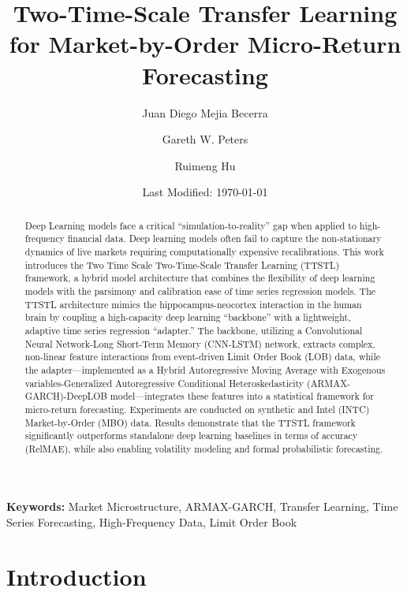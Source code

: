 \documentclass[10pt,a4paper,oneside]{article}
\title{Two-Time-Scale Transfer Learning for Market-by-Order Micro-Return Forecasting}
\author[1]{Juan Diego Mejia Becerra}
\author[1]{Gareth W. Peters}
\author[1,2]{Ruimeng Hu}
\affil[1]{Department of Statistics and Applied Probability, University of California, Santa Barbara}
\affil[2]{Department of Mathematics, University of California, Santa Barbara}
\date{Last Modified: \today}
\providecommand{\DIFaddtex}[1]{{\protect\color{blue} \sf #1}} %
\providecommand{\DIFdeltex}[1]{{\protect\color{red} \scriptsize #1}} %
\providecommand{\DIFaddbegin}{} %
\providecommand{\DIFaddend}{} %
\providecommand{\DIFdelbegin}{} %
\providecommand{\DIFdelend}{} %
\providecommand{\DIFadd}[1]{\texorpdfstring{\DIFaddtex{#1}}{#1}} %
\providecommand{\DIFdel}[1]{\texorpdfstring{\DIFdeltex{#1}}{}} %
\newcommand{\DIFscaledelfig}{0.5}
\newlength{\DIFdelgraphicswidth} %
\newlength{\DIFdelgraphicsheight} %
\newcommand{\DIFaddincludegraphics}[2][]{{\color{blue}\fbox{\DIFOincludegraphics[#1]{#2}}}} %
\newcommand{\DIFdelincludegraphics}[2][]{%
\sbox{\DIFdelgraphicsbox}{\DIFOincludegraphics[#1]{#2}}%
\settoboxwidth{\DIFdelgraphicswidth}{\DIFdelgraphicsbox} %
\settoboxtotalheight{\DIFdelgraphicsheight}{\DIFdelgraphicsbox} %
\scalebox{\DIFscaledelfig}{%
\parbox[b]{\DIFdelgraphicswidth}{\usebox{\DIFdelgraphicsbox}\\[-\baselineskip] \rule{\DIFdelgraphicswidth}{0em}}\llap{\resizebox{\DIFdelgraphicswidth}{\DIFdelgraphicsheight}{%
\setlength{\unitlength}{\DIFdelgraphicswidth}%
\begin{picture}(1,1)%
\thicklines\linethickness{2pt} %
{\color[rgb]{1,0,0}\put(0,0){\framebox(1,1){}}}%
{\color[rgb]{1,0,0}\put(0,0){\line( 1,1){1}}}%
{\color[rgb]{1,0,0}\put(0,1){\line(1,-1){1}}}%
\end{picture}%
}\hspace*{3pt}}} %
} %
\DeclareRobustCommand{\DIFaddbegin}{\DIFOaddbegin \let\includegraphics\DIFaddincludegraphics} %
\DeclareRobustCommand{\DIFaddend}{\DIFOaddend \let\includegraphics\DIFOincludegraphics} %
\DeclareRobustCommand{\DIFdelbegin}{\DIFOdelbegin \let\includegraphics\DIFdelincludegraphics} %
\DeclareRobustCommand{\DIFdelend}{\DIFOaddend \let\includegraphics\DIFOincludegraphics} %
\begin{document}
\DIFaddbegin {}
\DIFaddend 

\maketitle
\linenumbers

\begin{abstract}
    Deep Learning models face a critical ``simulation-to-reality'' gap when applied to high-frequency financial data. Deep learning models often fail to capture the non-stationary dynamics of live markets requiring computationally expensive recalibrations. This work introduces the \DIFdelbegin \DIFdel{Two Time Scale }\DIFdelend \DIFaddbegin \DIFadd{Two-Time-Scale }\DIFaddend Transfer Learning (TTSTL) framework, a hybrid model architecture that combines the flexibility of deep learning models with the parsimony and calibration ease of time series regression models. The TTSTL architecture mimics the hippocampus-neocortex interaction in the human brain by coupling a high-capacity deep learning ``backbone'' with a lightweight, adaptive time series regression ``adapter.'' The backbone, utilizing a Convolutional Neural Network-Long Short-Term Memory (CNN-LSTM) network, extracts complex, non-linear feature interactions from event-driven Limit Order Book (LOB) data, while the adapter—implemented as a Hybrid Autoregressive Moving Average with Exogenous variables-Generalized Autoregressive Conditional Heteroskedasticity (ARMAX-GARCH)-DeepLOB model—integrates these features into a statistical framework for micro-return forecasting. Experiments are conducted on synthetic and Intel (INTC) Market-by-Order (MBO) data. Results demonstrate that the TTSTL framework significantly outperforms standalone deep learning baselines in terms of accuracy (RelMAE), while \DIFaddbegin \DIFadd{also }\DIFaddend enabling volatility modeling and \DIFdelbegin \DIFdel{formal }\DIFdelend probabilistic forecasting.
\end{abstract}

\noindent \textbf{Keywords:} Market Microstructure, ARMAX-GARCH, Transfer Learning, Time Series Forecasting, High-Frequency Data, Limit Order Book

\section{Introduction}
\label{Sect:Intro}
\end{document}
